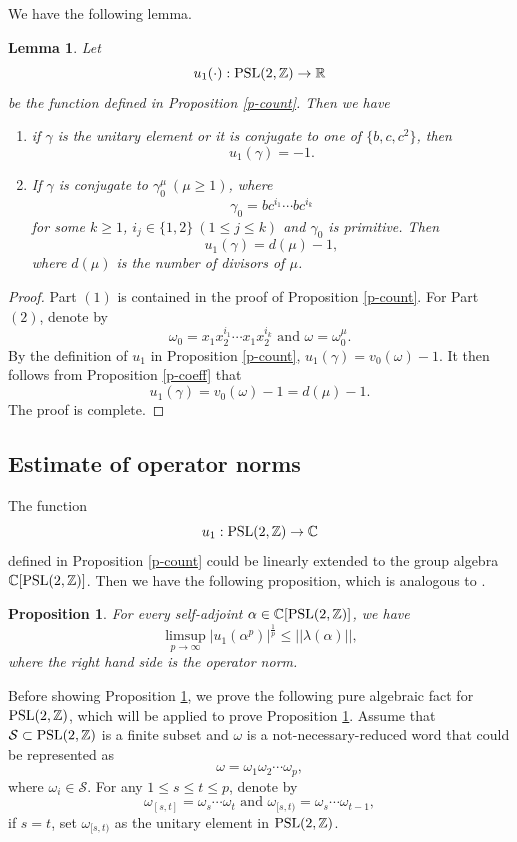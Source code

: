 \documentclass{amsart}
\theoremstyle{plain}
\newtheorem{proposition}[theorem]{Proposition}
\newtheorem{lemma}[theorem]{Lemma}
\theoremstyle{definition}
\theoremstyle{remark}
\begin{document}
    We have the following lemma.
    \begin{lemma}
       Let $$u_1(\cdot):\textnormal{PSL}(2,\mathbb{Z})\to\mathbb{R}$$ be the function defined in Proposition \ref{p-count}. Then we have
    \begin{enumerate}
        \item if $\gamma$ is the unitary element or it is conjugate to one  of $\{b,c,c^2\}$, then $$u_1(\gamma)=-1.$$
        \item If $\gamma$ is conjugate to $\gamma_0^\mu\ (\mu\geq 1)$, where
        $$\gamma_0=bc^{i_1}\cdots bc^{i_k}$$
        for some $k\geq 1$, $i_j\in\{1,2\}\ (1\leq j\leq k)$ and $\gamma_0$ is primitive.
        Then $$u_1(\gamma)=d(\mu)-1,$$
        where $d(\mu)$ is the number of divisors of $\mu$.  
    \end{enumerate}
    \end{lemma}
    \begin{proof}
        Part $(1)$ is contained in the proof of Proposition \ref{p-count}. For Part $(2)$, denote by 
        $$\omega_0=x_1x_2^{i_1}\cdots x_1x_2^{i_k}\text{ and }\omega=\omega_0^\mu.$$
        By the definition of $u_1$ in Proposition \ref{p-count}, $u_1(\gamma)=v_0(\omega)-1$. It then follows from Proposition \ref{p-coeff} that
        $$u_1(\gamma)=v_0(\omega)-1=d(\mu)-1.$$
        The proof is complete.
    \end{proof}
    
    \subsection{Estimate of operator norms}
     The function $$u_1:\textnormal{PSL}(2,\mathbb{Z})\to\mathbb{C}$$ defined in Proposition \ref{p-count} could be linearly extended to the group algebra $\mathbb{C}[\textnormal{PSL}(2,\mathbb{Z})]$.
     Then we have the following proposition, which is analogous to \cite[Assumption 1.4]{MPvH25}.
    \begin{proposition}\label{p-bound}
        For every self-adjoint $\alpha\in\mathbb{C}[\textnormal{PSL}(2,\mathbb{Z})]$, we have
        $$\limsup\limits_{p\to\infty}\left|u_1(\alpha^p)\right|^{\frac{1}{p}}\leq ||\lambda(\alpha)||,$$
        where the right hand side is the operator norm.
    \end{proposition}
    Before showing Proposition \ref{p-bound}, we prove the following pure algebraic fact for $\textnormal{PSL}(2,\mathbb{Z})$, which will be applied to prove Proposition \ref{p-bound}.
    Assume that $\mathcal{S}\subset\textnormal{PSL}(2,\mathbb{Z})$ is a finite subset and $\omega$ is a not-necessary-reduced word that could be represented as $$\omega=\omega_1\omega_2\cdots\omega_p,$$ where $\omega_i\in\mathcal{S}$. For any $1\leq s\leq t\leq p$, denote by
    $$\omega_{[s,t]}=\omega_s\cdots \omega_{t}\text{ and }\omega_{[s,t)}=\omega_s\cdots\omega_{t-1},$$
    if $s=t$, set $\omega_{[s,t)}$ as the unitary element in $\textnormal{PSL}(2,\mathbb{Z})$.
    
\end{document}
